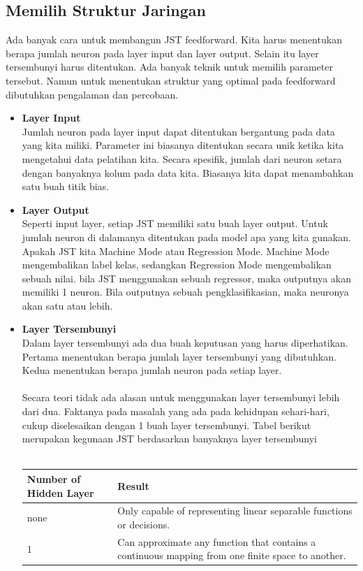\subsection{Memilih Struktur Jaringan}
Ada banyak cara untuk membangun JST feedforward. Kita harus menentukan berapa jumlah neuron pada layer input dan layer output. Selain itu layer tersembunyi harus ditentukan. Ada banyak teknik untuk memilih parameter tersebut. Namun untuk menentukan struktur yang optimal pada feedforward dibutuhkan pengalaman dan percobaan.
\begin{itemize}
\item\textbf{Layer Input} \\Jumlah neuron pada layer input dapat ditentukan bergantung pada data yang kita miliki. Parameter ini biasanya ditentukan secara unik ketika kita mengetahui data pelatihan kita. Secara spesifik, jumlah dari neuron setara dengan banyaknya kolum pada data kita. Biasanya kita dapat menambahkan satu buah titik bias.
\item\textbf{Layer Output} \\Seperti input layer, setiap JST memiliki satu buah layer output. Untuk jumlah neuron di dalamanya ditentukan pada model apa yang kita gunakan. Apakah JST kita Machine Mode atau Regression Mode. Machine Mode mengembalikan label kelas, sedangkan Regression Mode mengembalikan sebuah nilai. bila JST menggunakan sebuah regressor, maka outputnya akan memiliki 1 neuron. Bila outputnya sebuah pengklasifikasian, maka neuronya akan satu atau lebih.
\item\textbf{Layer Tersembunyi}\\Dalam layer tersembunyi ada dua buah keputusan yang harus diperhatikan. Pertama menentukan berapa jumlah layer tersembunyi yang dibutuhkan. Kedua menentukan berapa jumlah  neuron pada setiap layer.\\\\ 
Secara teori tidak ada alasan untuk menggunakan layer tersembunyi lebih dari dua. Faktanya pada masalah yang ada pada kehidupan sehari-hari, cukup diselesaikan dengan 1 buah layer tersembunyi. Tabel berikut merupakan kegunaan JST berdasarkan banyaknya layer tersembunyi\\\\
\begin{tabular}{|l|p{7cm}|}
\hline
Number of Hidden Layer & Result \\\hline
none & Only capable of representing linear separable functions or decisions.\\\hline
1 & Can approximate any function that contains a continuous mapping from one finite space to another.\\\hline

\end{tabular}
\end{itemize}
